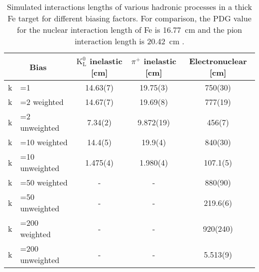 \begin{table}[htbp]
	\centering
	\caption[Simulated interactions lengths of various hadronic processes in a thick Fe target for different biasing factors.]{Simulated interactions lengths of various hadronic processes in a thick Fe target for different biasing factors. For comparison, the PDG value for the nuclear interaction length of Fe is \SI{16.77}{\centi\metre} and the pion interaction length is \SI{20.42}{\centi\metre} \cite{nist-database}.}
	\begin{tabular}{|r@{}l|c|c|c|}
		\toprule
		\multicolumn{2}{c|}{Bias} & $\mathrm{K^0_L}$ inelastic [cm]& $\pi^+$ inelastic [cm]& Electronuclear [cm]\\
		\midrule
		k&=1 & 14.63(7) & 19.75(3)  & 750(30)\\
		k&=2 weighted & 14.67(7) & 19.69(8)& 777(19)\\
		k&=2 unweighted & 7.34(2) & 9.872(19) & 456(7)\\
		k&=10 weighted & 14.4(5) & 19.9(4) & 840(30) \\
		k&=10 unweighted & 1.475(4) & 1.980(4) & 107.1(5)\\
		k&=50 weighted & - & - & 880(90) \\
		k&=50 unweighted & - & - & 219.6(6)\\
		k&=200 weighted & - & - & 920(240) \\
		k&=200 unweighted & - & - & 5.513(9)\\
		\bottomrule
	\end{tabular}
	\label{res:Tab:meanfreepaths}
\end{table}

